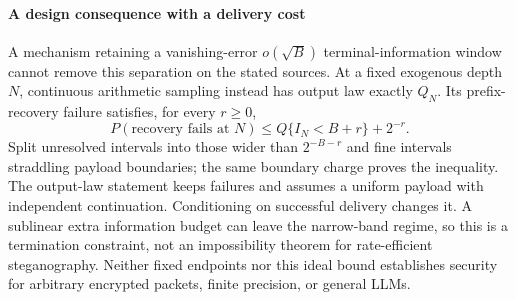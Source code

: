 \paragraph{A design consequence with a delivery cost}
A mechanism retaining a vanishing-error $o(\sqrt B)$ terminal-information window
cannot remove this separation on the stated sources. At a fixed exogenous
depth $N$, continuous arithmetic sampling instead has output law exactly $Q_N$.
Its prefix-recovery failure satisfies, for every $r\ge0$,
\begin{equation}
 P(\text{recovery fails at }N)
 \le Q\{I_N<B+r\}+2^{-r}.
 \label{eq:fixed-endpoint-failure}
\end{equation}
Split unresolved intervals into those wider than $2^{-B-r}$ and fine intervals
straddling payload boundaries; the same boundary charge proves the inequality.
The output-law statement keeps failures and assumes a uniform payload with
independent continuation. Conditioning on successful delivery changes it.
A sublinear extra information budget can leave the narrow-band regime, so this
is a termination constraint, not an impossibility theorem for rate-efficient
steganography. Neither fixed endpoints nor this ideal bound establishes
security for arbitrary encrypted packets, finite precision, or general LLMs.
